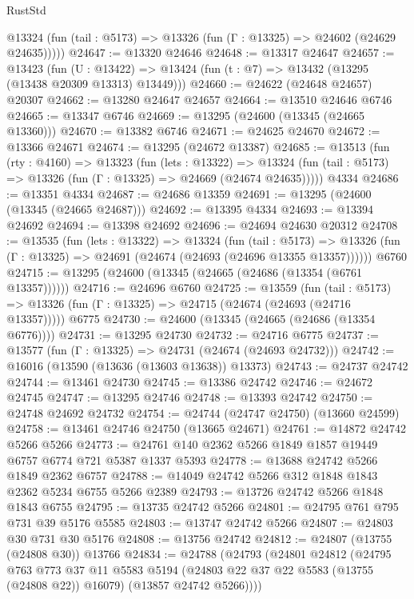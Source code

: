 \begin{lexlean}{RustStd}
\begin{coremodule}
      @13324 (fun (tail : @5173) => @13326 (fun (Γ : @13325) => @24602 (@24629 @24635)))))
@24647 := @13320 @24646
@24648 := @13317 @24647
@24657 := @13423
    (fun (U : @13422) => @13424 (fun (t : @7) => @13432 (@13295 (@13438 @20309 @13313) @13449)))
@24660 := @24622 (@24648 @24657) @20307
@24662 := @13280 @24647 @24657
@24664 := @13510 @24646 @6746
@24665 := @13347 @6746
@24669 := @13295 (@24600 (@13345 (@24665 @13360)))
@24670 := @13382 @6746
@24671 := @24625 @24670
@24672 := @13366 @24671
@24674 := @13295 (@24672 @13387)
@24685 := @13513
    (fun (rty : @4160) =>
    @13323
      (fun (lets : @13322) =>
      @13324 (fun (tail : @5173) => @13326 (fun (Γ : @13325) => @24669 (@24674 @24635)))))
    @4334
@24686 := @13351 @4334
@24687 := @24686 @13359
@24691 := @13295 (@24600 (@13345 (@24665 @24687)))
@24692 := @13395 @4334
@24693 := @13394 @24692
@24694 := @13398 @24692
@24696 := @24694 @24630 @20312
@24708 := @13535
    (fun (lets : @13322) =>
    @13324
      (fun (tail : @5173) =>
      @13326 (fun (Γ : @13325) => @24691 (@24674 (@24693 (@24696 @13355 @13357))))))
    @6760
@24715 := @13295 (@24600 (@13345 (@24665 (@24686 (@13354 (@6761 @13357))))))
@24716 := @24696 @6760
@24725 := @13559
    (fun (tail : @5173) => @13326 (fun (Γ : @13325) => @24715 (@24674 (@24693 (@24716 @13357)))))
    @6775
@24730 := @24600 (@13345 (@24665 (@24686 (@13354 @6776))))
@24731 := @13295 @24730
@24732 := @24716 @6775
@24737 := @13577 (fun (Γ : @13325) => @24731 (@24674 (@24693 @24732)))
@24742 := @16016 (@13590 (@13636 (@13603 @13638)) @13373)
@24743 := @24737 @24742
@24744 := @13461 @24730
@24745 := @13386 @24742
@24746 := @24672 @24745
@24747 := @13295 @24746
@24748 := @13393 @24742
@24750 := @24748 @24692 @24732
@24754 := @24744 (@24747 @24750) (@13660 @24599)
@24758 := @13461 @24746 @24750 (@13665 @24671)
@24761 := @14872 @24742 @5266 @5266
@24773 := @24761 @140 @2362 @5266 @1849 @1857 @19449 @6757 @6774 @721 @5387 @1337 @5393
@24778 := @13688 @24742 @5266 @1849 @2362 @6757
@24788 := @14049 @24742 @5266 @312 @1848 @1843 @2362 @5234 @6755 @5266 @2389
@24793 := @13726 @24742 @5266 @1848 @1843 @6755
@24795 := @13735 @24742 @5266
@24801 := @24795 @761 @795 @731 @39 @5176 @5585
@24803 := @13747 @24742 @5266
@24807 := @24803 @30 @731 @30 @5176
@24808 := @13756 @24742
@24812 := @24807 (@13755 (@24808 @30)) @13766
@24834 := @24788
    (@24793
      (@24801
        @24812
        (@24795
          @763
          @773
          @37
          @11
          @5583
          @5194
          (@24803 @22 @37 @22 @5583 (@13755 (@24808 @22)) @16079)
          (@13857 @24742 @5266))))

\end{coremodule}
\end{lexlean}
